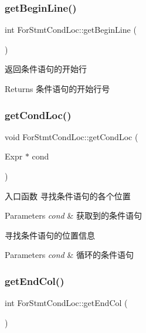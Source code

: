\subsubsection{\texorpdfstring{get\+Begin\+Line()}{getBeginLine()}}
{\footnotesize\ttfamily int For\+Stmt\+Cond\+Loc\+::get\+Begin\+Line (\begin{DoxyParamCaption}{ }\end{DoxyParamCaption})}

返回条件语句的开始行

\begin{DoxyReturn}{Returns}
条件语句的开始行号 
\end{DoxyReturn}
\mbox{\label{classForStmtCondLoc_a4579427843bc16d2ae834d234ed4a637}} 
\subsubsection{\texorpdfstring{get\+Cond\+Loc()}{getCondLoc()}}
{\footnotesize\ttfamily void For\+Stmt\+Cond\+Loc\+::get\+Cond\+Loc (\begin{DoxyParamCaption}\item[{Expr $\ast$}]{cond }\end{DoxyParamCaption})}

入口函数 寻找条件语句的各个位置 
\begin{DoxyParams}{Parameters}
{\em cond} & 获取到的条件语句\\
\hline
\end{DoxyParams}
寻找条件语句的位置信息 
\begin{DoxyParams}{Parameters}
{\em cond} & 循环的条件语句 \\
\hline
\end{DoxyParams}
\mbox{\label{classForStmtCondLoc_a68dd344d53c30751ca6c0f6c4aaa49d0}} 
\subsubsection{\texorpdfstring{get\+End\+Col()}{getEndCol()}}
{\footnotesize\ttfamily int For\+Stmt\+Cond\+Loc\+::get\+End\+Col (\begin{DoxyParamCaption}{ }\end{DoxyParamCaption})}

